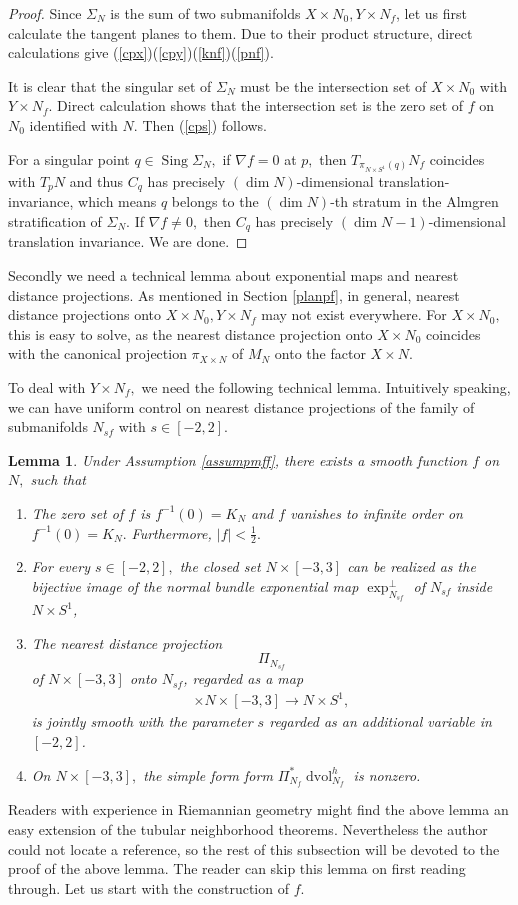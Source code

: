 \documentclass[11pt,a4paper]{amsart}
\numberwithin{equation}{section}
\newcommand{\sing}{{\operatorname{Sing}}}
\newcommand{\Si}{\Sigma}
\newcommand{\dvol}{\operatorname{dvol}}
\newcommand{\du}{^\ast}
\newcommand{\m}{^{-1}}
\newcommand{\na}{\nabla}
\theoremstyle{plain}
\newtheorem{lem}[exam]{Lemma}
\theoremstyle{definition}
\numberwithin{equation}{subsection}
\begin{document}
\begin{proof}
Since $\Si_N$ is the sum of two submanifolds $X\times N_0,Y\times N_f$, let us first calculate the tangent planes to them. Due to their product structure, direct calculations give (\ref{cpx})(\ref{cpy})(\ref{knf})(\ref{pnf}).

It is clear that the singular set of $\Si_N$ must be the intersection set of $X\times N_0$ with $Y\times N_f.$ Direct calculation shows that the intersection set is the zero set of $f $ on $N_0$ identified with $N.$ Then (\ref{cps}) follows.

For a singular point $q\in \sing \Si_N,$ if $\na f=0$ at $p,$ then $T_{\pi_{N\times S^1}(q)}N_f$ coincides with $T_p N$ and thus $C_q$ has precisely $(\dim N)$-dimensional translation-invariance, which means $q$ belongs to the $(\dim N)$-th stratum in the Almgren stratification of $\Si_N.$ If $\na f\not=0,$ then $C_q$ has precisely $(\dim N-1)$-dimensional translation invariance. We are done.
\end{proof}
Secondly we need a technical lemma about exponential maps and nearest distance projections. As mentioned in Section \ref{planpf}, in general, nearest distance projections onto $X\times N_0,Y\times N_f$ may not exist everywhere. For $X\times N_0,$ this is easy to solve, as the nearest distance projection onto $X\times N_0$ coincides with the canonical projection $\pi_{X\times N}$ of $M_N$ onto the factor $X\times N$.

To deal with $Y\times N_f,$ we need the following technical lemma. Intuitively speaking, we can have uniform control on nearest distance projections of the family of submanifolds $N_{sf}$ with $s\in[-2,2]$.
\begin{lem}\label{lemexp}
Under Assumption \ref{assumpmff}, there exists a smooth function $f$ on $N,$ such that
\begin{enumerate}
\item \label{lfz}The zero set of $f$ is $f\m(0)=K_N$ and $f$ vanishes to infinite order on  $f\m(0)=K_N.$ Furthermore, $|f|<\frac{1}{2}.$
\item \label{lei}For every $s\in[-2,2],$ the closed set $N\times [-3,3]$ can be realized as the bijective image of the normal bundle exponential map $\exp^\perp_{N_{sf}}$ of $N_{sf}$ inside $N\times S^1$,
\item \label{lps}The nearest distance projection  $$\Pi_{N_{sf}}$$ of $N\times [-3,3]$ onto $N_{sf}$, regarded as a map 
\begin{align*}
[-2,2]\times N\times [-3,3]\to N\times S^1,
\end{align*}
is jointly smooth with the parameter $s$ regarded as an additional variable in $[-2,2]$.
\item On $N\times[-3,3],$ the simple form form $\Pi_{N_f}\du\dvol_{N_f}^h$ is nonzero.\label{lfn}
\end{enumerate} 
\end{lem}
Readers with experience in Riemannian geometry might find the above lemma an easy extension of the tubular neighborhood theorems. Nevertheless the author could not locate a reference, so the rest of this subsection will be devoted to the proof of the above lemma. The reader can skip this lemma on first reading through. Let us start with the construction of $f.$
\end{document}
